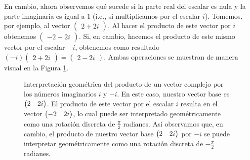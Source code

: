 \documentclass[12pt,dvipsnames]{article}
\begin{document}
En cambio, ahora observemos qué sucede si la parte real del escalar es nula y la parte imaginaria es igual a $1$ (i.e., si multiplicamos por el escalar $i$). Tomemos, por ejemplo, al vector $\begin{pmatrix}2+2i\end{pmatrix}$. Al hacer el producto de este vector por $i$ obtenemos $\begin{pmatrix}-2+2i\end{pmatrix}$. Si, en cambio, hacemos el producto de este mismo vector por el escalar $-i$, obtenemos como resultado $(-i)\begin{pmatrix}2+2i\end{pmatrix}=\begin{pmatrix}2-2i\end{pmatrix}$. Ambas operaciones se muestran de manera visual en la Figura \ref{fig:Producto_de_un_vector_complejo_por_i}.

\begin{figure}[h!]
    \centering
    \caption{Interpretación geométrica del producto de un vector complejo por los números imaginarios $i$ y $-i$. En este caso, nuestro vector base es $\protect\begin{pmatrix} 2 & 2i \protect\end{pmatrix}$. El producto de este vector por el escalar $i$ resulta en el vector $\protect\begin{pmatrix} -2 & 2i \protect\end{pmatrix}$, lo cual puede ser interpretado geométricamente como una rotación discreta de $\frac{\pi}{2}$ radianes. Así observamos que, en cambio, el producto de nuestro vector base $\protect\begin{pmatrix} 2 & 2i \protect\end{pmatrix}$ por $-i$ se puede interpretar geométricamente como una rotación discreta de $-\frac{\pi}{2}$ radianes.}
    \label{fig:Producto_de_un_vector_complejo_por_i}
\end{figure}
\end{document}
